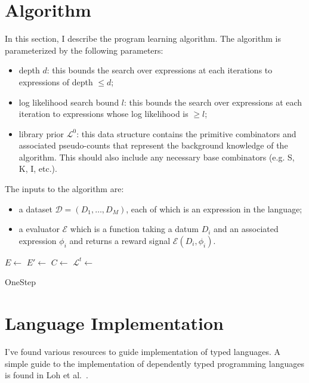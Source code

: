 \documentclass{article}
\begin{document}
\section{Algorithm}
In this section, I describe the program learning algorithm. The
algorithm is parameterized by the following parameters: 

\begin{itemize}
\item depth $d$: this bounds the search over expressions at each
  iterations to expressions of depth $\leq d$;
\item log likelihood search bound $l$: this bounds the search over
  expressions at each iteration to expressions whose log likelihood is
  $\geq l$;
\item library prior $\mathcal{L}^0$: this data structure contains the
  primitive combinators and associated pseudo-counts that represent
  the background knowledge of the algorithm. This should also include
  any necessary base combinators (e.g. S, K, I, etc.).
\end{itemize}

The inputs to the algorithm are:
\begin{itemize}
\item a dataset $\mathcal{D} = (D_1, \dots, D_M)$, each of which is an
  expression in the language;
\item a evaluator $\mathcal{E}$ which is a function taking a datum
  $D_i$ and an associated expression $\phi_i$ and returns a reward
  signal $\mathcal{E}(D_i, \phi_i)$.
\end{itemize}

\begin{minipage}{.7\linewidth}
  \begin{algorithm}[H]
    \SetAlgoLined 
    $E \leftarrow $ \;
    $E' \leftarrow $ 
      \;
    $C \leftarrow$ \;
    $\mathcal{L}^t \leftarrow$ \;
    \caption{OneStep}
  \end{algorithm}
\end{minipage}



\section{Language Implementation}
I've found various resources to guide implementation of typed
languages.  A simple guide to the implementation of dependently typed
programming languages is found in Loh et al.~\cite{lowsimply}.




\end{document}
